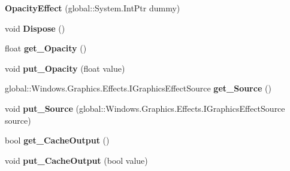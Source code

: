 \begin{DoxyCompactItemize}
{\bfseries Opacity\+Effect} (global\+::\+System.\+Int\+Ptr dummy)
\item 
\mbox{\label{class_microsoft_1_1_graphics_1_1_canvas_1_1_effects_1_1_opacity_effect_a1246fe8a73f548e85044aa9a5849aabc}} 
void {\bfseries Dispose} ()
\item 
\mbox{\label{class_microsoft_1_1_graphics_1_1_canvas_1_1_effects_1_1_opacity_effect_a3a7a9f455303d589535bffc1fbff1ed7}} 
float {\bfseries get\+\_\+\+Opacity} ()
\item 
\mbox{\label{class_microsoft_1_1_graphics_1_1_canvas_1_1_effects_1_1_opacity_effect_a12edc59773ce19245163b1e4f33ab94a}} 
void {\bfseries put\+\_\+\+Opacity} (float value)
\item 
\mbox{\label{class_microsoft_1_1_graphics_1_1_canvas_1_1_effects_1_1_opacity_effect_a2d98ab034bde8cfb8102ebc23ccf5f02}} 
global\+::\+Windows.\+Graphics.\+Effects.\+I\+Graphics\+Effect\+Source {\bfseries get\+\_\+\+Source} ()
\item 
\mbox{\label{class_microsoft_1_1_graphics_1_1_canvas_1_1_effects_1_1_opacity_effect_a51fd5110fa28908e4867c288ed9a30d9}} 
void {\bfseries put\+\_\+\+Source} (global\+::\+Windows.\+Graphics.\+Effects.\+I\+Graphics\+Effect\+Source source)
\item 
\mbox{\label{class_microsoft_1_1_graphics_1_1_canvas_1_1_effects_1_1_opacity_effect_a7a670a01415eb1ff9f50c8405404c02b}} 
bool {\bfseries get\+\_\+\+Cache\+Output} ()
\item 
\mbox{\label{class_microsoft_1_1_graphics_1_1_canvas_1_1_effects_1_1_opacity_effect_a42248a501afee0e1d6884be01879797e}} 
void {\bfseries put\+\_\+\+Cache\+Output} (bool value)
\item 
\mbox{\label{class_microsoft_1_1_graphics_1_1_canvas_1_1_effects_1_1_opacity_effect_a748e9f864efbadb3d647e448b13a4c17}} 

\end{DoxyCompactItemize}
